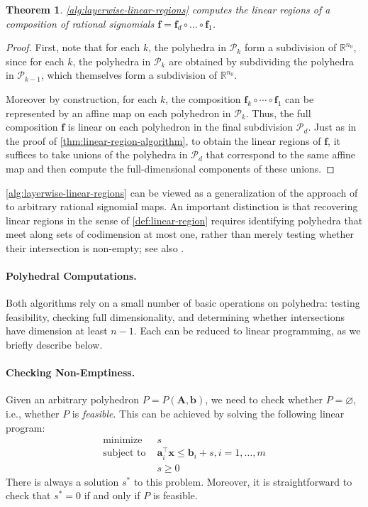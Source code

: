 \documentclass[10pt]{article}
\newtheorem{theorem}{Theorem}[]
\theoremstyle{definition}
\theoremstyle{remark}
\newcommand{\RR}{{\mathbb{R}}}
\renewcommand{\vec}[1]{\mathbf{#1}}
\def\va{{\vec{a}}}
\def\vb{{\vec{b}}}
\def\vf{{\vec{f}}}
\def\vx{{\vec{x}}}
\def\mA{{\bm{A}}}
\begin{document}
\begin{theorem} \label{thm:linear-region-composition-algorithm}
    \cref{alg:layerwise-linear-regions} computes the linear regions of a composition of rational signomials $\vf = \vf_d\circ\dots\circ\vf_1$.
\end{theorem}

\begin{proof}
    First, note that for each $k$, the polyhedra in $\mathcal P_k$ form a subdivision of $\RR^{n_0}$, since for each $k$, the polyhedra in $\mathcal P_k$ are obtained by subdividing the polyhedra in $\mathcal P_{k-1}$, which themselves form a subdivision of $\RR^{n_0}$.

    Moreover by construction, for each $k$, the composition $\vf_k \circ \dotsb \circ \vf_1$ can be represented by an affine map on each polyhedron in $\mathcal P_k$.
    Thus, the full composition $\vf$ is linear on each polyhedron in the final subdivision $\mathcal P_d$. Just as in the proof of \cref{thm:linear-region-algorithm}, to obtain the linear regions of $\vf$, it suffices to take unions of the polyhedra in $\mathcal P_d$ that correspond to the same affine map and then compute the full-dimensional components of these unions.
\end{proof}

\cref{alg:layerwise-linear-regions} can be viewed as a generalization of the approach of \cite{wang2022estimation} to arbitrary rational signomial maps. An important distinction is that recovering linear regions in the sense of \cref{def:linear-region} requires identifying polyhedra that meet along sets of codimension at most one, rather than merely testing whether their intersection is non-empty; see also \cite{stargalla2025computational}.

\paragraph{Polyhedral Computations.} Both algorithms rely on a small number of basic operations on polyhedra: testing feasibility, checking full dimensionality, and determining whether intersections have dimension at least $n-1$. Each can be reduced to linear programming, as we briefly describe below.

\paragraph{Checking Non-Emptiness.} Given an arbitrary polyhedron $P = P(\mA, \vb)$, we need to check whether $P = \varnothing$, i.e., whether $P$ is \emph{feasible}.
This can be achieved by solving the following linear program:
\begin{align*}
    \text{minimize } & s \\
    \text{subject to } & \va_i^{\top} \vx \le \vb_i + s, i=1, \dotsc, m \\
    & s \ge 0
\end{align*}
There is always a solution $s^*$ to this problem. Moreover, it is straightforward to check that $s^* = 0$ if and only if $P$ is feasible.
\end{document}
